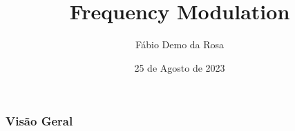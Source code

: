 \documentclass[xcolor=dvipsnames, aspectratio=169]{beamer}
\title[]{Frequency Modulation} %
\author[]{Fábio Demo da Rosa} %
\institute[UFSM] %
{
Universidade Federal de Santa Maria \\ %
Pós-Graduação em Ciência da Computação \\
Disciplina de Robótica Móvel\\
\medskip
\textit{faberdemo@gmail.com} %
}
\date{25 de Agosto de 2023} %
\begin{document}
\begin{frame}
\titlepage %
\end{frame}

\begin{frame}
\frametitle{Visão Geral} %
\tableofcontents %
\end{frame}


\end{document}
